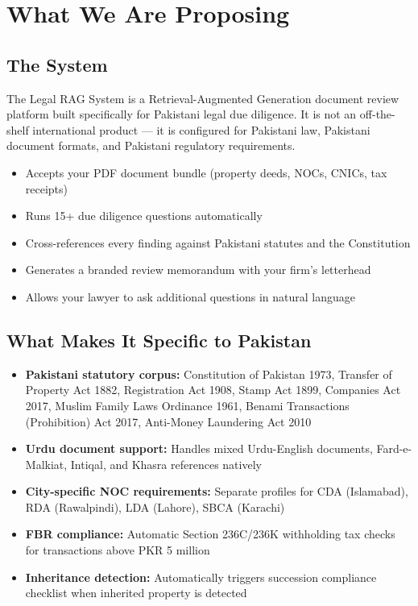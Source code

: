 \documentclass[12pt, a4paper]{article}
\begin{document}
\section{What We Are Proposing}

\subsection{The System}

The Legal RAG System is a Retrieval-Augmented Generation document review platform
built specifically for Pakistani legal due diligence. It is not an off-the-shelf
international product --- it is configured for Pakistani law, Pakistani document
formats, and Pakistani regulatory requirements.

\begin{itemize}
  \item Accepts your PDF document bundle (property deeds, NOCs, CNICs, tax receipts)
  \item Runs 15+ due diligence questions automatically
  \item Cross-references every finding against Pakistani statutes and the Constitution
  \item Generates a branded review memorandum with your firm's letterhead
  \item Allows your lawyer to ask additional questions in natural language
\end{itemize}

\subsection{What Makes It Specific to Pakistan}

\begin{itemize}
  \item \textbf{Pakistani statutory corpus:} Constitution of Pakistan 1973,
    Transfer of Property Act 1882, Registration Act 1908, Stamp Act 1899,
    Companies Act 2017, Muslim Family Laws Ordinance 1961, Benami Transactions
    (Prohibition) Act 2017, Anti-Money Laundering Act 2010
  \item \textbf{Urdu document support:} Handles mixed Urdu-English documents,
    Fard-e-Malkiat, Intiqal, and Khasra references natively
  \item \textbf{City-specific NOC requirements:} Separate profiles for CDA
    (Islamabad), RDA (Rawalpindi), LDA (Lahore), SBCA (Karachi)
  \item \textbf{FBR compliance:} Automatic Section 236C/236K withholding tax
    checks for transactions above PKR 5 million
  \item \textbf{Inheritance detection:} Automatically triggers succession
    compliance checklist when inherited property is detected
\end{itemize}
\end{document}
